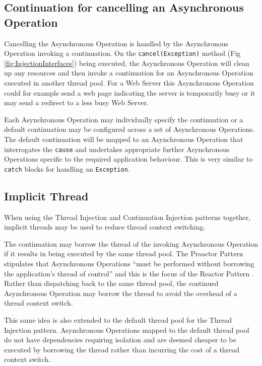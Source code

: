 \documentclass[prodmode]{style/acmlarge}
\begin{document}
\subsection{Continuation for cancelling an Asynchronous Operation}

Cancelling the Asynchronous Operation is handled by the Asynchronous Operation
invoking a continuation.  On the \texttt{cancel(Exception)} method (Fig
\ref{fig:InjectionInterfaces}) being executed, the Asynchronous Operation will
clean up any resources and then invoke a continuation for an Asynchronous
Operation executed in another thread pool.  For a Web Server this Asynchronous
Operation could for example send a web page indicating the server is temporarily
busy or it may send a redirect to a less busy Web Server.

Each Asynchronous Operation may individually specify the continuation or a
default continuation may be configured across a set of Asynchronous Operations.
The default continuation will be mapped to an Asynchronous Operation that
interrogates the \texttt{cause} and undertakes appropriate further Asynchronous
Operations specific to the required application behaviour.  This is very similar
to \texttt{catch} blocks for handling an \texttt{Exception}.


\subsection{Implicit Thread}

When using the Thread Injection and Continuation Injection patterns together,
implicit threads may be used to reduce thread context switching.

The continuation may borrow the thread of the invoking Asynchronous Operation if
it results in being executed by the same thread pool.  The Proactor Pattern
stipulates that Asynchronous Operations ``must be performed without borrowing
the application's thread of control'' \cite[p. 8]{proactor} and this is the
focus of the Reactor Pattern \cite{reactor}.  Rather than dispatching back to
the same thread pool, the continued Asynchronous Operation may borrow the thread
to avoid the overhead of a thread context switch.

This same idea is also extended to the default thread pool for the Thread
Injection pattern.  Asynchronous Operations mapped to the default thread pool do
not have dependencies requiring isolation and are deemed cheaper to be executed
by borrowing the thread rather than incurring the cost of a thread context
switch.
\end{document}
